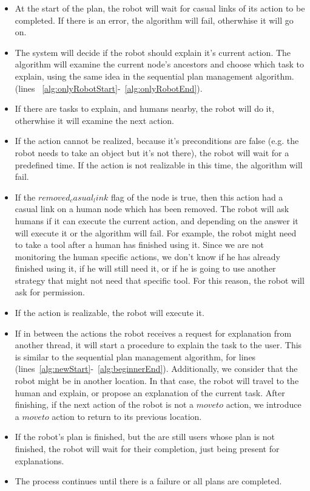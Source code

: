 \begin{itemize}
\item	At the start of the plan, the robot will wait for casual links of its action to be completed. If there is an error, the algorithm will fail, otherwhise it will go on.
\item The system will decide if the robot should explain it's current action. The algorithm will examine the current node's ancestors and choose which task to explain, using the same idea in the sequential plan management algorithm. (lines ~\ref{alg:onlyRobotStart}-~\ref{alg:onlyRobotEnd}). 
\item If there are tasks to explain, and humans nearby, the robot will do it, otherwhise it will examine the next action.
\item If the action cannot be realized, because it's preconditions are false (e.g. the robot needs to take an object but it's not there), the robot will wait for a predefined time. If the action is not realizable in this time, the algorithm will fail.
\item If the $removed_casual_link$ flag of the node is true, then this action had a casual link on a human node which has been removed. The robot will ask humans if it can execute the current action, and depending on the answer it will execute it or the algorithm will fail. For example, the robot might need to take a tool after a human has finished using it. Since we are not monitoring the human specific actions, we don't know if he has already finished using it, if he will still need it, or if he is going to use another strategy that might not need that specific tool. For this reason, the robot will ask for permission.
\item If the action is realizable, the robot will execute it.
\item If in between the actions the robot receives a request for explanation from another thread, it will start a procedure to explain the task to the user. This is similar to the sequential plan management algorithm, for lines  (lines~\ref{alg:newStart}-~\ref{alg:beginnerEnd}). Additionally, we consider that the robot might be in another location. In that case, the robot will travel to the human and explain, or propose an explanation of the current task. After finishing, if the next action of the robot is not a $move to$ action, we introduce a $move to$ action to return to its previous location.
\item If the robot's plan is finished, but the are still users whose plan is not finished, the robot will wait for their completion, just being present for explanations.
\item The process continues until there is a failure or all plans are completed.
\end{itemize}

